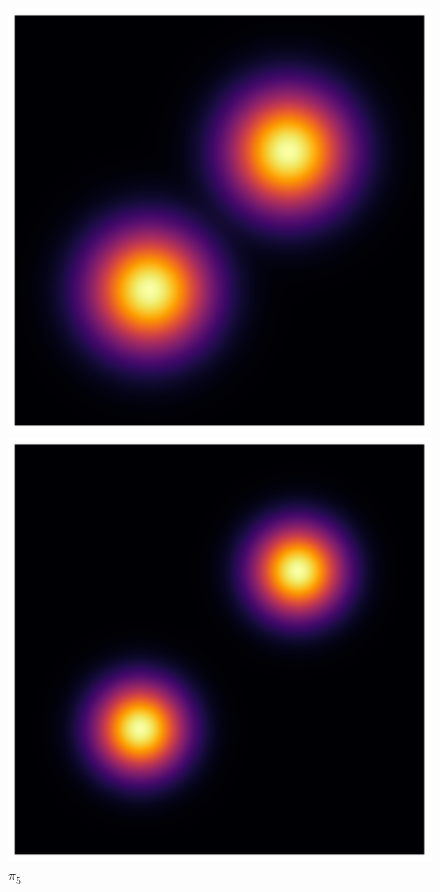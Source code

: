 \begin{figure}[t]
\begin{minipage}{0.15\textwidth}
      \caption*{$\pi_4$}
    \end{minipage}
    \begin{minipage}{0.15\textwidth}
      \centering
      \includegraphics[width=\textwidth]{../img/heatmap_path_5.pdf}
      \caption*{$\pi_5$}
    \end{minipage}
    \begin{minipage}{0.15\textwidth}
      \centering
      \includegraphics[width=\textwidth]{../img/heatmap_path_6.pdf}

\end{minipage}
\end{figure}
